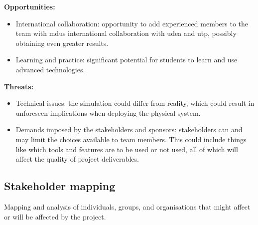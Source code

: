 \textbf{Opportunities:}
\begin{itemize}
    \item International collaboration: opportunity to add experienced members to the team with \ac{mdu}s international collaboration with \ac{udea} and \ac{utp}, possibly obtaining even greater results. 
    \item Learning and practice: significant potential for students to learn and use advanced technologies. 
\end{itemize}

\textbf{Threats:}
\begin{itemize}
    \item Technical issues: the simulation could differ from reality, which could result in unforeseen implications when deploying the physical system. 
    \item Demands imposed by the stakeholders and sponsors: stakeholders can and may limit the choices available to team members. This could include things like which tools and features are to be used or not used, all of which will affect the quality of project deliverables. 
\end{itemize}


\begin{comment}
\textbf{Conclusions:}
\begin{itemize}
    \item Need to secure additional funding and focus on continuous skills development
    \item Strategic alliances should be considered to mitigate weaknesses and threats
    \item Constant monitoring and lobbying required to navigate regulatory landscape
\end{itemize}
\end{comment}


\subsection{Stakeholder mapping}

Mapping and analysis of individuals, groups, and organisations that might affect or will be affected by the project.

